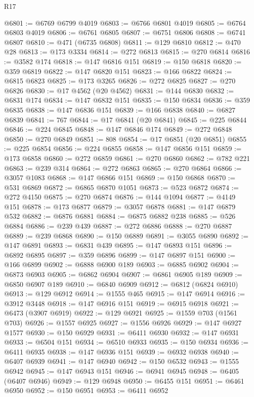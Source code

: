 \begin{lexlean}{R17}
\begin{coremodule}
@6801 := @6769 @6799 @4019
@6803 := @6766 @6801 @4019
@6805 := @6764 @6803 @4019
@6806 := @6761 @6805
@6807 := @6751 @6806
@6808 := @6741 @6807
@6810 := @471 (@6735 @6808)
@6811 := @129 @6810
@6812 := @470 @28
@6813 := @173 @3334
@6814 := @272 @6813
@6815 := @270 @6814
@6816 := @3582 @174
@6818 := @147 @6816 @151
@6819 := @150 @6818
@6820 := @359 @6819
@6822 := @147 @6820 @151
@6823 := @166 @6822
@6824 := @6815 @6823
@6825 := @173 @3265
@6826 := @272 @6825
@6827 := @270 @6826
@6830 := @17 @4562 (@20 @4562)
@6831 := @144 @6830
@6832 := @6831 @174
@6834 := @147 @6832 @151
@6835 := @150 @6834
@6836 := @359 @6835
@6838 := @147 @6836 @151
@6839 := @166 @6838
@6840 := @6827 @6839
@6841 := 767
@6844 := @17 @6841 (@20 @6841)
@6845 := @225 @6844
@6846 := @224 @6845
@6848 := @147 @6846 @174
@6849 := @272 @6848
@6850 := @270 @6849
@6851 := 808
@6854 := @17 @6851 (@20 @6851)
@6855 := @225 @6854
@6856 := @224 @6855
@6858 := @147 @6856 @151
@6859 := @173 @6858
@6860 := @272 @6859
@6861 := @270 @6860
@6862 := @782 @221
@6863 := @239 @314
@6864 := @272 @6863
@6865 := @270 @6864
@6866 := @3057 @1083
@6868 := @147 @6866 @151
@6869 := @150 @6868
@6870 := @531 @6869
@6872 := @6865 @6870 @1051
@6873 := @523 @6872
@6874 := @272 @4150
@6875 := @270 @6874
@6876 := @144 @1094
@6877 := @4149 @151
@6878 := @173 @6877
@6879 := @3057 @6878
@6881 := @147 @6879 @532
@6882 := @6876 @6881
@6884 := @6875 @6882 @238
@6885 := @526 @6884
@6886 := @239 @439
@6887 := @272 @6886
@6888 := @270 @6887
@6889 := @239 @6868
@6890 := @150 @6889
@6891 := @3055 @6890
@6892 := @147 @6891
@6893 := @6831 @439
@6895 := @147 @6893 @151
@6896 := @6892 @6895
@6897 := @359 @6896
@6899 := @147 @6897 @151
@6900 := @166 @6899
@6902 := @6888 @6900 @189
@6903 := @6885 @6902
@6904 := @6873 @6903
@6905 := @6862 @6904
@6907 := @6861 @6905 @189
@6909 := @6850 @6907 @189
@6910 := @6840 @6909
@6912 := @6812 (@6824 @6910)
@6913 := @129 @6912
@6914 := @1555 @465
@6915 := @147 @6914
@6916 := @3912 @3448
@6918 := @147 @6916 @151
@6919 := @6915 @6918
@6921 := @6473 (@3907 @6919)
@6922 := @129 @6921
@6925 := @1559 @703 (@1561 @703)
@6926 := @1557 @6925
@6927 := @1556 @6926
@6929 := @147 @6927 @1577
@6930 := @150 @6929
@6931 := @6411 @6930
@6932 := @147 @6931
@6933 := @6504 @151
@6934 := @6510 @6933
@6935 := @150 @6934
@6936 := @6411 @6935
@6938 := @147 @6936 @151
@6939 := @6932 @6938
@6940 := @6407 @6939
@6941 := @147 @6940
@6942 := @150 @6532
@6943 := @1555 @6942
@6945 := @147 @6943 @151
@6946 := @6941 @6945
@6948 := @6405 (@6407 @6946)
@6949 := @129 @6948
@6950 := @6455 @151
@6951 := @6461 @6950
@6952 := @150 @6951
@6953 := @6411 @6952

\end{coremodule}
\end{lexlean}
